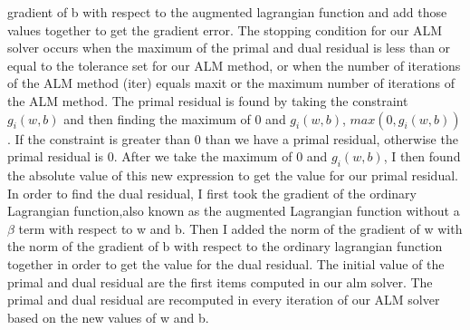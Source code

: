 \documentclass[11pt]{article}
\begin{document}
gradient 
of b with respect to the augmented lagrangian function and add those values together to get the gradient 
error. The stopping condition for our ALM solver occurs when the maximum of the primal and dual residual  
is 
less than or equal to the tolerance set for our ALM method, or when the number of iterations of the ALM 
method (iter) equals maxit or the maximum number of iterations of the ALM method. The primal residual is 
found by taking the constraint $g_{i}\left(w,b\right)$ and then finding the maximum of 0 and $g_{i}
\left(w,b\right)$, $max\left(0, g_{i}\left(w,b\right)\right)$. If the constraint is greater than 0 than 
we 
have a primal residual, otherwise the primal residual is 0. After we take the maximum of 0 and $g_{i}
\left(w,b\right)$, I then found the absolute value of this new expression to get the value for our 
primal 
residual. In order to find the dual residual, I first took the gradient of the ordinary Lagrangian 
function,also known as the augmented Lagrangian function without a $\beta$ term with respect to w and b.
Then I added the norm of the gradient of w with the norm of the gradient of b with respect to the 
ordinary 
lagrangian function together in order to get the value for the dual residual. The initial value of the 
primal and dual residual are the first items computed in our alm solver. The primal and dual residual 
are 
recomputed in every iteration of our ALM solver based on the new values of w and b.
\end{document}
